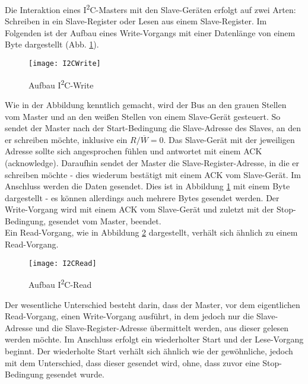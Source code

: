 \documentclass[
	letterpaper, %
	10pt, %
]{CSUniSchoolLabReport}
\begin{document}
\begin{spacing}{1.6}
Die Interaktion eines I\textsuperscript{2}C-Masters mit den Slave-Geräten erfolgt auf zwei Arten: Schreiben in ein Slave-Register oder Lesen aus einem Slave-Register. Im Folgenden ist der Aufbau eines Write-Vorgangs mit einer Datenlänge von einem Byte dargestellt (Abb. \ref{fig:I2C-Write}).\\
\begin{figure}[H]
    \centering
    \texttt{[image: I2CWrite]}
    \caption{Aufbau I\textsuperscript{2}C-Write \cite[7]{TI_I2C}}
    \label{fig:I2C-Write}
\end{figure}
Wie in der Abbildung kenntlich gemacht, wird der Bus an den grauen Stellen vom Master und an den weißen Stellen von einem Slave-Gerät gesteuert. So sendet der Master nach der Start-Bedingung die Slave-Adresse des Slaves, an den er schreiben möchte, inklusive ein $R/\overline{W} = 0$. Das Slave-Gerät mit der jeweiligen Adresse sollte sich angesprochen fühlen und antwortet mit einem ACK (acknowledge). Daraufhin sendet der Master die Slave-Register-Adresse, in die er schreiben möchte - dies wiederum bestätigt mit einem ACK vom Slave-Gerät. Im Anschluss werden die Daten gesendet. Dies ist in Abbildung \ref{fig:I2C-Write} mit einem Byte dargestellt - es können allerdings auch mehrere Bytes gesendet werden. Der Write-Vorgang wird mit einem ACK vom Slave-Gerät und zuletzt mit der Stop-Bedingung, gesendet vom Master, beendet.\\
Ein Read-Vorgang, wie in Abbildung \ref{fig:I2C-Read} dargestellt, verhält sich ähnlich zu einem Read-Vorgang.\\
\begin{figure}[H]
    \centering
    \texttt{[image: I2CRead]}
    \caption{Aufbau I\textsuperscript{2}C-Read \cite[7]{TI_I2C}}
    \label{fig:I2C-Read}
\end{figure}
Der wesentliche Unterschied besteht darin, dass der Master, vor dem eigentlichen Read-Vorgang, einen Write-Vorgang ausführt, in dem jedoch nur die Slave-Adresse und die Slave-Register-Adresse übermittelt werden, aus dieser gelesen werden möchte. Im Anschluss erfolgt ein wiederholter Start und der Lese-Vorgang beginnt. Der wiederholte Start verhält sich ähnlich wie der gewöhnliche, jedoch mit dem Unterschied, dass dieser gesendet wird, ohne, dass zuvor eine Stop-Bedingung gesendet wurde.


\end{spacing}
\end{document}
